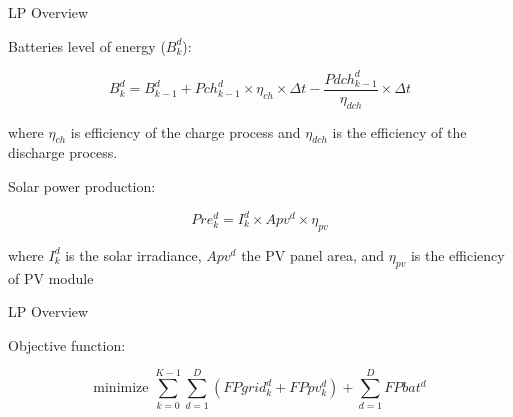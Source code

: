 \documentclass[Ligatures=TeX,table,svgnames,usetotalslideindicator,compress,10pt]{beamer}
\begin{document}
\begin{frame}{LP Overview}

  \alert{Batteries level of energy ($B^d_ k$):} 

  \begin{equation} \label{eq:bdk}
    B^d_k = B^d_{k-1}  + Pch^d_{k-1} \times \eta_{ch} \times \Delta{t} - \frac{Pdch^d_{k-1}}{\eta_{dch}} \times \Delta{t}
  \end{equation}

  where $\eta_{ch}$ is efficiency of the charge process and $\eta_{dch}$ is the efficiency of the discharge process.

  \alert{Solar power production:}

  \begin{equation} \label{eq:predk}
    Pre^d_{k}= I^d_k \times Apv^d \times \eta_{pv}
  \end{equation}

  where $I^d_k$ is the solar irradiance, $Apv^d$ the PV panel area,  and $\eta_{pv}$ is the efficiency of PV module

\end{frame}


\begin{frame}{LP Overview}


  \alert{Objective function:}
  
  \begin{equation} \label{eq:FPALL}
    \text{minimize }\sum_{k=0}^{K-1} \sum_{d=1}^D ( FPgrid^d_k +  FPpv^d_k) + \sum_{d=1}^D FPbat^d
  \end{equation}

\end{frame}
\end{document}
